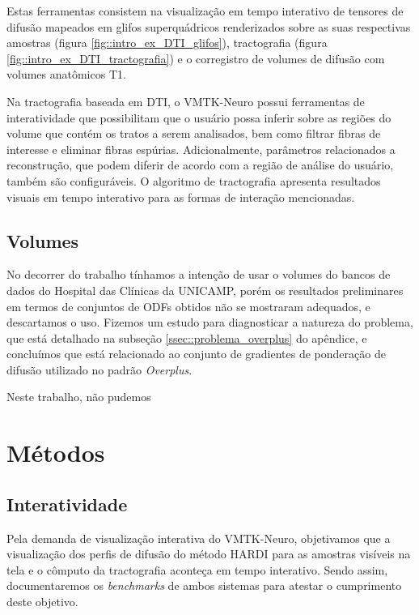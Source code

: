 \documentclass[
    12pt,                %
    oneside,            %
    a4paper,            %
    english,            %
    french,                %
    spanish,            %
    brazil                %
    ]{abntex2}
\begin{document}
Estas ferramentas consistem na visualização em tempo interativo de tensores de difusão mapeados em glifos superquádricos \cite{Kindlmann2004} renderizados sobre as suas respectivas amostras (figura \ref{fig::intro_ex_DTI_glifos}), tractografia (figura \ref{fig::intro_ex_DTI_tractografia}) e o corregistro de volumes de difusão com volumes anatômicos T1.



Na tractografia baseada em DTI, o VMTK-Neuro possui ferramentas de interatividade que possibilitam que o usuário possa inferir sobre as regiões do volume que contém os tratos a serem analisados, bem como filtrar fibras de interesse e eliminar fibras espúrias. Adicionalmente, parâmetros relacionados a reconstrução, que podem diferir de acordo com a região de análise do usuário, também são configuráveis. O algoritmo de tractografia apresenta resultados visuais em tempo interativo para as formas de interação mencionadas.


\subsection{Volumes}





No decorrer do trabalho tínhamos a intenção de usar o volumes do bancos de dados do Hospital das Clínicas da UNICAMP, porém os resultados preliminares em termos de conjuntos de ODFs obtidos não se mostraram adequados, e descartamos o uso. Fizemos um estudo para diagnosticar a natureza do problema, que está detalhado na subseção \ref{ssec::problema_overplus} do apêndice, e concluímos que está relacionado ao conjunto de gradientes de ponderação de difusão utilizado no padrão \textit{Overplus}.

Neste trabalho, não pudemos


\section{Métodos}
\subsection{Interatividade}

Pela demanda de visualização interativa do VMTK-Neuro, objetivamos que a visualização dos perfis de difusão do método HARDI para as amostras visíveis na tela e o cômputo da tractografia aconteça em tempo interativo. Sendo assim, documentaremos os \textit{benchmarks} de ambos sistemas para atestar o cumprimento deste objetivo.
\end{document}
